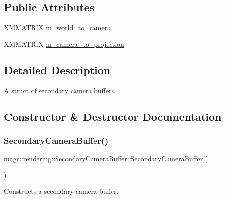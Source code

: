 \subsection*{Public Attributes}
\begin{DoxyCompactItemize}
\item 
X\+M\+M\+A\+T\+R\+IX \hyperlink{structmage_1_1rendering_1_1_secondary_camera_buffer_a3f131146f9374058ace582bfae3e90b7}{m\+\_\+world\+\_\+to\+\_\+camera}
\item 
X\+M\+M\+A\+T\+R\+IX \hyperlink{structmage_1_1rendering_1_1_secondary_camera_buffer_a05e3f20005a72a77017ecb76f683efdd}{m\+\_\+camera\+\_\+to\+\_\+projection}
\end{DoxyCompactItemize}


\subsection{Detailed Description}
A struct of secondary camera buffers. 

\subsection{Constructor \& Destructor Documentation}
\hypertarget{structmage_1_1rendering_1_1_secondary_camera_buffer_a296dad06794aeb4017c37d3aa8eb9641}{}\label{structmage_1_1rendering_1_1_secondary_camera_buffer_a296dad06794aeb4017c37d3aa8eb9641} 
\subsubsection{\texorpdfstring{Secondary\+Camera\+Buffer()}{SecondaryCameraBuffer()}\hspace{0.1cm}{\footnotesize\ttfamily [1/3]}}
{\footnotesize\ttfamily mage\+::rendering\+::\+Secondary\+Camera\+Buffer\+::\+Secondary\+Camera\+Buffer (\begin{DoxyParamCaption}{ }\end{DoxyParamCaption})\hspace{0.3cm}{\ttfamily [noexcept]}}

Constructs a secondary camera buffer. \hypertarget{structmage_1_1rendering_1_1_secondary_camera_buffer_a8f1945d8c623d5ac685ff8fbaeffd09c}{}\label{structmage_1_1rendering_1_1_secondary_camera_buffer_a8f1945d8c623d5ac685ff8fbaeffd09c} 
